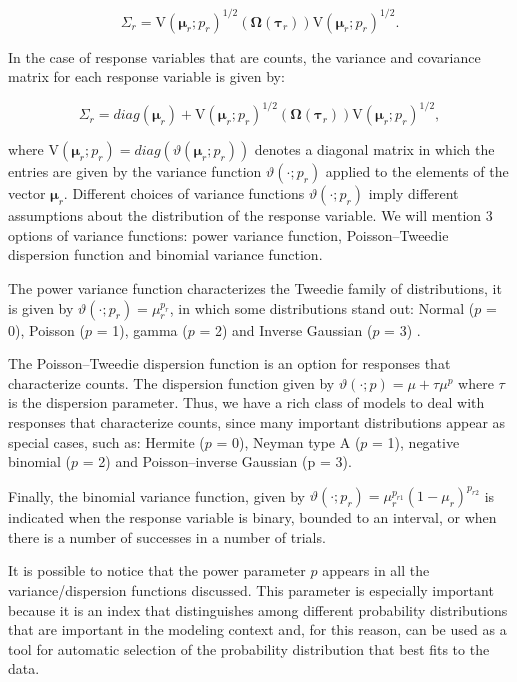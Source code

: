 \documentclass[AMA,STIX1COL]{WileyNJD-v2}
\begin{document}
$$
\Sigma_r =
\mathrm{V}\left(\boldsymbol{\mu}_r; p_r\right)^{1/2}(\boldsymbol{\Omega}\left(\boldsymbol{\tau}_r\right))\mathrm{V}\left(\boldsymbol{\mu}_r; p_r\right)^{1/2}.
$$

In the case of response variables that are counts, the variance and covariance matrix for each response variable is given by:

$$
\Sigma_r = diag(\boldsymbol{\mu}_r)+ \mathrm{V}\left(\boldsymbol{\mu}_r; p_r\right)^{1/2}(\boldsymbol{\Omega}\left(\boldsymbol{\tau}_r\right))\mathrm{V}\left(\boldsymbol{\mu}_r; p_r\right)^{1/2},
$$

\noindent where $\mathrm{V}\left(\boldsymbol{\mu}_r; p_r\right) = diag(\vartheta(\boldsymbol{\mu}_r; p_r))$ denotes a diagonal matrix in which the entries are given by the variance function $\vartheta(\cdot; p_r)$ applied to the elements of the vector $\boldsymbol{\mu}_r$. Different choices of variance functions $\vartheta(\cdot; p_r)$ imply different assumptions about the distribution of the response variable. We will mention 3 options of variance functions: power variance function, Poisson–Tweedie dispersion function and binomial variance function.

The power variance function characterizes the Tweedie family of distributions, it is given by $\vartheta\left(\cdot; p_r\right) = \mu^{p_r}_r$, in which some distributions stand out: Normal ($p $ = 0), Poisson ($p$ = 1), gamma ($p$ = 2) and Inverse Gaussian ($p$ = 3) \cite{Jorgensen87, Jorgensen97}. 

The Poisson–Tweedie dispersion function \cite{Jorgensen15} is an option for responses that characterize counts. The dispersion function given by $\vartheta\left(\cdot; p\right) = \mu + \tau\mu^p$ where $\tau$ is the dispersion parameter. Thus, we have a rich class of models to deal with responses that characterize counts, since many important distributions appear as special cases, such as: Hermite ($p$ = 0), Neyman type A ($p$ = 1), negative binomial ($p$ = 2) and Poisson–inverse Gaussian (p = $3$).

Finally, the binomial variance function, given by $\vartheta\left(\cdot; p_r\right) = \mu^{p_{r1}}_r(1 - \mu_r)^{p_{r2}}$ is indicated when the response variable is binary, bounded to an interval, or when there is a number of successes in a number of trials.

It is possible to notice that the power parameter $p$ appears in all the variance/dispersion functions discussed. This parameter is especially important because it is an index that distinguishes among different probability distributions that are important in the modeling context and, for this reason, can be used as a tool for automatic selection of the probability distribution that best fits to the data.
\end{document}
